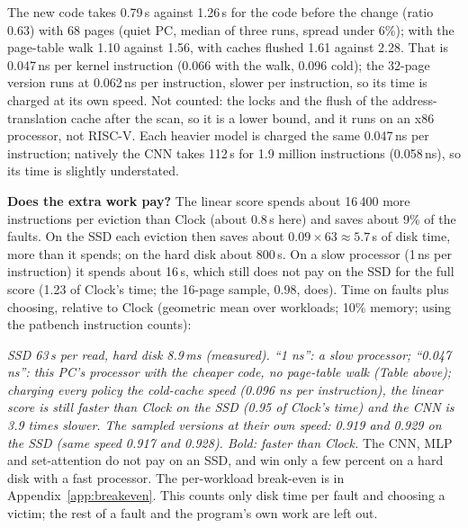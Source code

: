 \documentclass[10.5pt,a4paper]{article}
\begin{document}
\begin{center}\small

\end{center}

The new code takes 0.79\,\textmu s against 1.26\,\textmu s for the code before the change (ratio 0.63) with 68 pages (quiet PC, median of three runs, spread under 6\%); with the page-table walk 1.10 against 1.56, with caches flushed 1.61 against 2.28. That is 0.047\,ns per kernel instruction (0.066 with the walk, 0.096 cold); the 32-page version runs at 0.062\,ns per instruction, slower per instruction, so its time is charged at its own speed. Not counted: the locks and the flush of the address-translation cache after the scan, so it is a lower bound, and it runs on an x86 processor, not RISC-V. Each heavier model is charged the same 0.047\,ns per instruction; natively the CNN takes 112\,\textmu s for 1.9 million instructions (0.058\,ns), so its time is slightly understated.

\textbf{Does the extra work pay?} The linear score spends about 16\,400 more instructions per eviction than Clock (about 0.8\,\textmu s here) and saves about 9\% of the faults. On the SSD each eviction then saves about
$0.09 \times 63 \approx 5.7$\,\textmu s of disk time, more than it spends; on the hard disk about 800\,\textmu s. On a slow processor (1\,ns per instruction) it spends about 16\,\textmu s, which still does not pay on the SSD for the full score (1.23 of Clock's time; the 16-page sample, 0.98, does).
Time on faults plus choosing, relative to Clock (geometric mean over workloads; 10\% memory; using the patbench instruction counts):

\begin{center}\small
\resizebox{\linewidth}{!}{}
\end{center}
\emph{SSD 63\,\textmu s per read, hard disk 8.9\,ms (measured). ``1 ns'': a slow processor; ``0.047 ns'': this PC's processor with the cheaper code, no page-table walk (Table above); charging every policy the cold-cache speed (0.096 ns per instruction), the linear score is still faster than Clock on the SSD (0.95 of Clock's time) and the CNN is 3.9 times slower. The sampled versions at their own speed: 0.919 and 0.929 on the SSD (same speed 0.917 and 0.928). Bold: faster than Clock.}
The CNN, MLP and set-attention do not pay on an SSD, and win only a few percent on a hard disk with a fast processor. The per-workload break-even is in Appendix~\ref{app:breakeven}. This counts only disk time per fault and
choosing a victim; the rest of a fault and the program's own work are left out.
\end{document}
